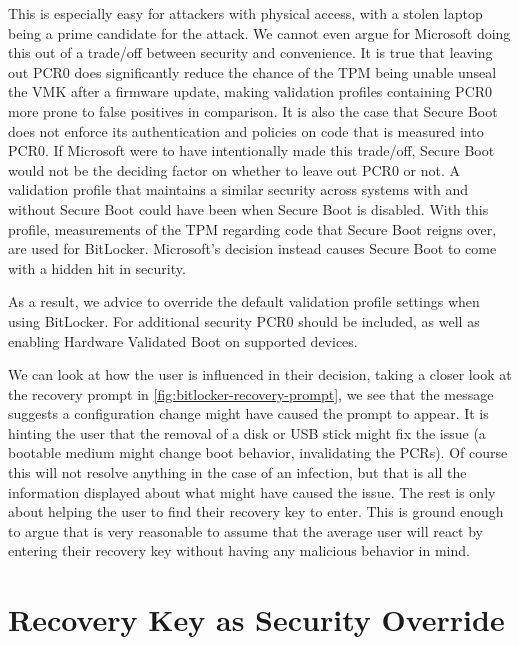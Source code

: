 This is especially easy for attackers with physical access, with a stolen laptop being a prime candidate for the attack.
We cannot even argue for Microsoft doing this out of a trade\-/off between security and convenience.
It is true that leaving out \ac{PCR}0 does significantly reduce the chance of the \ac{TPM} being unable unseal the \ac{VMK} after a firmware update, making validation profiles containing \ac{PCR}0 more prone to false positives in comparison.
It is also the case that Secure Boot does not enforce its authentication and policies on code that is measured into \ac{PCR}0.
If Microsoft were to have intentionally made this trade\-/off, Secure Boot would not be the deciding factor on whether to leave out \ac{PCR}0 or not.
A validation profile that maintains a similar security across systems with and without Secure Boot could have been \hyperref[tab:pcr-usage]{} when Secure Boot is disabled.
With this profile, measurements of the \ac{TPM} regarding code that Secure Boot reigns over, are used for BitLocker.
Microsoft's decision instead causes Secure Boot to come with a hidden hit in security.

As a result, we advice to override the default validation profile settings when using BitLocker.
For additional security \ac{PCR}0 should be included, as well as enabling Hardware Validated Boot on supported devices.


We can look at how the user is influenced in their decision, taking a closer look at the recovery prompt in \autoref{fig:bitlocker-recovery-prompt}, we see that the message suggests a configuration change might have caused the prompt to appear. It is hinting the user that the removal of a disk or \ac{USB} stick might fix the issue (a bootable medium might change boot behavior, invalidating the \acp{PCR}). Of course this will not resolve anything in the case of an infection, but that is all the information displayed about what might have caused the issue. The rest is only about helping the user to find their recovery key to enter.
This is ground enough to argue that is very reasonable to assume that the average user will react by entering their recovery key without having any malicious behavior in mind.


\section{Recovery Key as Security Override}

